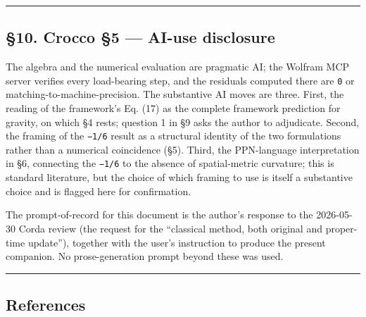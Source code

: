 \documentclass[
  11pt,
]{article}
\begin{document}
\begin{center}\rule{0.5\linewidth}{0.5pt}\end{center}

\hypertarget{crocco-5-ai-use-disclosure}{%
\subsection{§10. Crocco §5 --- AI-use
disclosure}\label{crocco-5-ai-use-disclosure}}

The algebra and the numerical evaluation are pragmatic AI; the Wolfram
MCP server verifies every load-bearing step, and the residuals computed
there are \texttt{0} or matching-to-machine-precision. The substantive
AI moves are three. First, the reading of the framework's Eq. (17) as
the complete framework prediction for gravity, on which §4 rests;
question 1 in §9 asks the author to adjudicate. Second, the framing of
the \texttt{−1/6} result as a structural identity of the two
formulations rather than a numerical coincidence (§5). Third, the
PPN-language interpretation in §6, connecting the \texttt{−1/6} to the
absence of spatial-metric curvature; this is standard literature, but
the choice of which framing to use is itself a substantive choice and is
flagged here for confirmation.

The prompt-of-record for this document is the author's response to the
2026-05-30 Corda review (the request for the ``classical method, both
original and proper-time update''), together with the user's instruction
to produce the present companion. No prose-generation prompt beyond
these was used.

\begin{center}\rule{0.5\linewidth}{0.5pt}\end{center}

\hypertarget{references}{%
\subsection{References}\label{references}}
\end{document}

